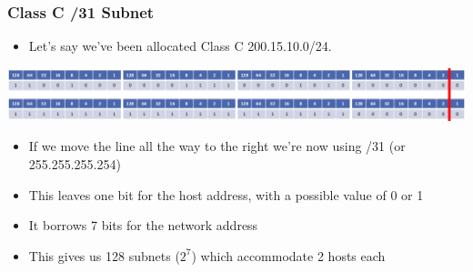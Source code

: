 \documentclass[pdflatex,compress]{beamer}
\begin{document}
\begin{frame}
	\frametitle{Class C /31 Subnet}
	\begin{itemize}
		\item Let’s say we’ve been allocated Class C 200.15.10.0/24.
	\end{itemize}
	\begin{center}
		\includegraphics[width=1\linewidth]{img/img03}
	\end{center}
	\begin{itemize}
		\item If we move the line all the way to the right we're now using /31 (or 255.255.255.254)
		\item This leaves one bit for the host address, with a possible value of 0 or 1
		\item It borrows 7 bits for the network address
		\item This gives us 128 subnets ($ 2^7 $) which accommodate 2 hosts each
	\end{itemize}
\end{frame}
\end{document}

